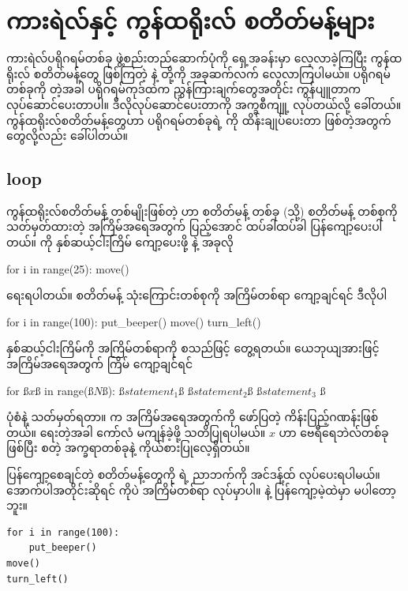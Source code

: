\chapter{ကားရဲလ်နှင့် ကွန်ထရိုးလ် စတိတ်မန့်များ}\label{ch:ch02}


ကားရဲလ်ပရိုဂရမ်တစ်ခု ဖွဲ့စည်းတည်ဆောက်ပုံကို ရှေ့အခန်းမှာ လေ့လာခဲ့ကြပြီး ကွန်ထရိုးလ် စတိတ်မန့်တွေ ဖြစ်ကြတဲ့  \fEn{,}  \fEn{,}  နဲ့  တို့ကို အခုဆက်လက် လေ့လာကြပါမယ်။ ပရိုဂရမ်တစ်ခုကို  တဲ့အခါ ပရိုဂရမ်ကုဒ်ထဲက ညွှန်ကြားချက်တွေအတိုင်း ကွန်ပျူတာက လုပ်ဆောင်ပေးတာပါ။ ဒီလိုလုပ်ဆောင်ပေးတာကို အက္ခစီကျူ့  လုပ်တယ်လို့ ခေါ်တယ်။ ကွန်ထရိုးလ်စတိတ်မန့်တွေဟာ ပရိုဂရမ်တစ်ခုရဲ့  ကို ထိန်းချုပ်ပေးတာ ဖြစ်တဲ့အတွက်  တွေလို့လည်း ခေါ်ပါတယ်။

\section{ loop}

ကွန်ထရိုးလ်စတိတ်မန့် တစ်မျိုးဖြစ်တဲ့   ဟာ စတိတ်မန့် တစ်ခု (သို့) စတိတ်မန့် တစ်စုကို သတ်မှတ်ထားတဲ့ အကြိမ်အရေအတွက် ပြည့်အောင် ထပ်ခါထပ်ခါ ပြန်ကျော့ပေးပါတယ်။   ကို နှစ်ဆယ့်ငါးကြိမ် ကျော့ပေးဖို့   နဲ့ အခုလို 
%
\begin{py}
for i in range(25):
    move()
\end{py}
%
ရေးရပါတယ်။ \fEn{,} \fEn{,}  စတိတ်မန့် သုံးကြောင်းတစ်စုကို အကြိမ်တစ်ရာ ကျော့ချင်ရင် ဒီလိုပါ 
%
\begin{py}
for i in range(100):
    put_beeper()
    move()
    turn_left()
\end{py}
%

နှစ်ဆယ့်ငါးကြိမ်ကို \fEn{,} အကြိမ်တစ်ရာကို  စသည်ဖြင့် တွေ့ရတယ်။ ယေဘု\allowbreak ယျအားဖြင့် အကြိမ်အရေအတွက်  ကြိမ် ကျော့ချင်ရင်  
%
\begin{py}
for ß$x$ß in range(ß$N$ß):
    ß$statement_1$ß
    ß$statement_2$ß
    ß$statement_3$ ß
\end{py}
%
ပုံစံနဲ့ သတ်မှတ်ရတာ။  က  အကြိမ်အရေအတွက်ကို ဖော်ပြတဲ့ ကိန်းပြည့်ဂဏန်းဖြစ်တယ်။   ရေးတဲ့အခါ ကော်လံ \fCode{:} မကျန်ခဲ့ဖို့ သတိပြုရပါမယ်။ $x$ ဟာ ဗေရီရေဘဲလ်တစ်ခုဖြစ်ပြီး \fEn{,} \fEn{,}  စတဲ့ အက္ခရာတစ်ခုနဲ့ ကိုယ်စားပြုလေ့ရှိတယ်။

\begin{mytcbox}
ပြန်ကျော့စေချင်တဲ့ စတိတ်မန့်တွေကို  ရဲ့ ညာဘက်ကို အင်ဒန့်ထ် လုပ်ပေးရပါမယ်။ အောက်ပါအတိုင်းဆိုရင်  ကိုပဲ အကြိမ်တစ်ရာ လုပ်မှာပါ။  နဲ့  ပြန်ကျော့မဲ့ထဲမှာ မပါတော့ဘူး။
\setlength{\fboxsep}{0pt}
\begin{verbatim}
for i in range(100):
    put_beeper()
move()
turn_left()
\end{verbatim}
\end{mytcbox}

